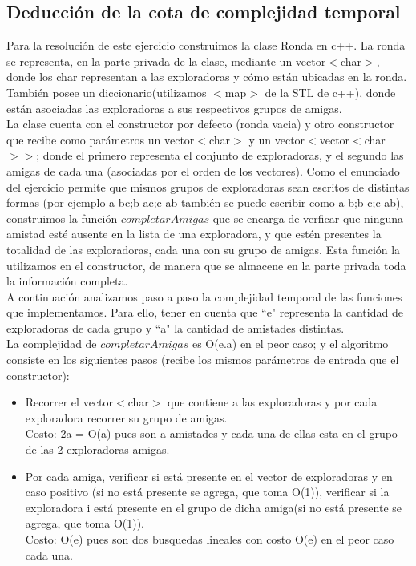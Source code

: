\subsection{Deducción de la cota de complejidad temporal}

Para la resolución de este ejercicio construimos la clase Ronda en c++. La ronda se representa, en la parte privada de la clase,
mediante un vector$<$char$>$, donde los char representan a las exploradoras y cómo están ubicadas en la ronda. También posee un 
diccionario(utilizamos $<$map$>$ de la STL de c++), donde están asociadas las exploradoras a sus respectivos grupos de amigas. \\
La clase cuenta con el constructor por defecto (ronda vacia) y otro constructor que recibe como parámetros un vector$<$char$>$ y un
vector$<$vector$<$char$>>$; donde el primero representa el conjunto de exploradoras, y el segundo las amigas de cada una (asociadas
por el orden de los vectores). Como el enunciado del ejercicio permite que mismos grupos de exploradoras sean escritos de distintas 
formas (por ejemplo a bc;b ac;c ab también se puede escribir como a b;b c;c ab), construimos la función $completarAmigas$ que se 
encarga de verficar que ninguna amistad esté ausente en la lista de una exploradora, y que estén presentes la totalidad de las 
exploradoras, cada una con su grupo de amigas. Esta función la utilizamos en el constructor, de manera que se almacene en la parte 
privada toda la información completa. \\
A continuación analizamos paso a paso la complejidad temporal de las funciones que implementamos. Para ello, tener en cuenta que 
``e"$ $ representa la cantidad de exploradoras de cada grupo y  ``a"$ $ la cantidad de amistades distintas. \\
La complejidad de $completarAmigas$ es O(e.a) en el peor caso; y el algoritmo consiste en los siguientes pasos (recibe los mismos 
parámetros de entrada que el constructor): \\
\begin{itemize}
\item Recorrer el vector$<$char$>$ que contiene a las exploradoras y por cada exploradora recorrer su grupo de amigas. \\
Costo: 2a = O(a) pues son a amistades y cada una de ellas esta en el grupo de las 2 exploradoras amigas. 
\item Por cada amiga, verificar si está presente en el vector de exploradoras y en caso positivo (si no está presente se agrega, que 
toma O(1)), verificar si la exploradora i está presente en el grupo de dicha amiga(si no está presente se agrega, que 
toma O(1)).  \\
Costo: O(e) pues son dos busquedas lineales con costo O(e) en el peor caso cada una.
\end{itemize}
